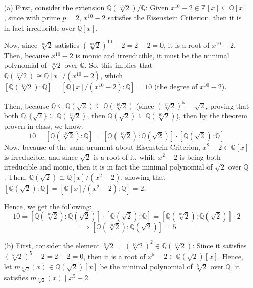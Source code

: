 \documentclass{article}
\begin{document}
\begin{itemize}
    \item[(a)] First, consider the extension $\mathbb{Q}(\sqrt[10]{2})/\mathbb{Q}$: Given $x^{10}-2\in\mathbb{Z}[x]\subseteq\mathbb{Q}[x]$, since with prime $p=2$, $x^{10}-2$ satisfies the Eisenstein Criterion,
    then it is in fact irreducible over $\mathbb{Q}[x]$.

    Now, since $\sqrt[10]{2}$ satisfies $(\sqrt[10]{2})^{10}-2=2-2=0$, it is a root of $x^{10}-2$.
    Then, because $x^{10}-2$ is monic and irreudicible, it must be the minimal polynomial of $\sqrt[10]{2}$ over $\mathbb{Q}$.
    So, this implies that $\mathbb{Q}(\sqrt[10]{2})\cong \mathbb{Q}[x]/(x^{10}-2)$, which $[\mathbb{Q}(\sqrt[10]{2}):\mathbb{Q}]=[\mathbb{Q}[x]/(x^{10}-2):\mathbb{Q}]=10$ (the degree of $x^{10}-2$).

    Then, because $\mathbb{Q}\subseteq \mathbb{Q}(\sqrt{2})\subseteq \mathbb{Q}(\sqrt[10]{2})$ (since $(\sqrt[10]{2})^5 = \sqrt{2}$, proving that both $\mathbb{Q},\{\sqrt{2}\}\subseteq \mathbb{Q}(\sqrt[10]{2})$,
    then $\mathbb{Q}(\sqrt{2})\subseteq \mathbb{Q}(\sqrt[10]{2})$), then by the theorem proven in class, we know:
    $$10=[\mathbb{Q}(\sqrt[10]{2}):\mathbb{Q}]=[\mathbb{Q}(\sqrt[10]{2}):\mathbb{Q}(\sqrt{2})]\cdot [\mathbb{Q}(\sqrt{2}):\mathbb{Q}]$$
    Now, because of the same arument about Eisenstein Criterion, $x^2-2\in\mathbb{Q}[x]$ is irreducible, and since $\sqrt{2}$ is a root of it, while $x^2-2$ is being both irreducible and monic,
    then it is in fact the minimal polynomial of $\sqrt{2}$ over $\mathbb{Q}$. Then, $\mathbb{Q}(\sqrt{2})\cong\mathbb{Q}[x]/(x^2-2)$, showing that $[\mathbb{Q}(\sqrt{2}):\mathbb{Q}]=[\mathbb{Q}[x]/(x^2-2):\mathbb{Q}]=2$.

    Hence, we get the following:
    $$10=[\mathbb{Q}(\sqrt[10]{2}):\mathbb{Q}(\sqrt{2})]\cdot [\mathbb{Q}(\sqrt{2}):\mathbb{Q}]=[\mathbb{Q}(\sqrt[10]{2}):\mathbb{Q}(\sqrt{2})]\cdot 2$$
    $$\implies [\mathbb{Q}(\sqrt[10]{2}):\mathbb{Q}(\sqrt{2})]=5$$

    \hfil

    \item[(b)] First, consider the element $\sqrt[5]{2}=(\sqrt[10]{2})^2 \in \mathbb{Q}(\sqrt[10]{2})$: Since it satisfies $(\sqrt[5]{2})^5-2 = 2-2 = 0$, then it is a root of $x^5-2 \in \mathbb{Q}(\sqrt{2})[x]$.
    Hence, let $m_{\sqrt[5]{2}}(x)\in\mathbb{Q}(\sqrt{2})[x]$ be the minimal polynomial of $\sqrt[5]{2}$ over $\mathbb{Q}$, it satisfies $m_{\sqrt[5]{2}}(x)\mid x^5-2$.


\end{itemize}
\end{document}
